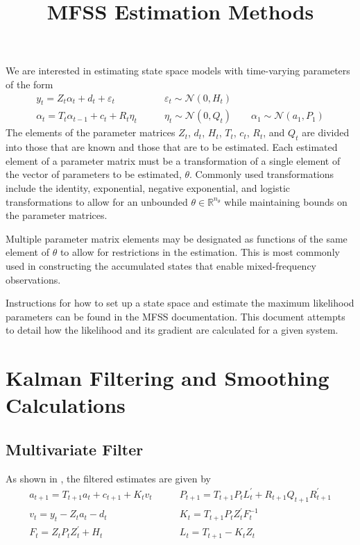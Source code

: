 \documentclass[12pt]{article}
\title{MFSS Estimation Methods}
\date{}
\author{}
\begin{document}
\maketitle

	We are interested in estimating state space models with time-varying parameters of the form
	\begin{align*} 
	y_t = Z_t \alpha_t + d_t + \varepsilon_t &\qquad \varepsilon_t \sim \mathcal{N}(0,H_t) \\ 
	\alpha_{t} = T_t \alpha_{t-1} + c_t + R_t \eta_t &\qquad \eta_t \sim \mathcal{N}(0, Q_t) \qquad
	\alpha_1 \sim \mathcal{N}(a_1, P_1) 
	\end{align*} 
	The elements of the parameter matrices $Z_t$, $d_t$, $H_t$, $T_t$, $c_t$, $R_t$, and $Q_t$ are divided into those that are known and those that are to be estimated. Each estimated element of a parameter matrix must be a transformation of a single element of the vector of parameters to be estimated, $\theta$. Commonly used transformations include the identity, exponential, negative exponential, and logistic transformations to allow for an unbounded $\theta \in \mathbb{R}^{n_\theta}$ while maintaining bounds on the parameter matrices. 

	Multiple parameter matrix elements may be designated as functions of the same element of $\theta$ to allow for restrictions in the estimation. This is most commonly used in constructing the accumulated states that enable mixed-frequency observations.

	Instructions for how to set up a state space and estimate the maximum likelihood parameters can be found in the MFSS documentation. This document attempts to detail how the likelihood and its gradient are calculated for a given system.

\section{Kalman Filtering and Smoothing Calculations}

\subsection*{Multivariate Filter}
	As shown in \cite{dk_book}, the filtered estimates are given by 
	\begin{align*}
	a_{t+1} = T_{t+1} a_t + c_{t+1} + K_t v_t &\qquad
	P_{t+1} = T_{t+1} P_t L_t^\prime + R_{t+1} Q_{t+1} R_{t+1}^\prime \\
	v_t = y_t - Z_ta_t - d_t &\qquad
	K_t = T_{t+1} P_t Z_t^\prime F_t^{-1} \\
	F_t = Z_t P_t Z_t^\prime + H_t &\qquad
	L_t = T_{t+1} - K_t Z_t 
	\end{align*} 
\end{document}
